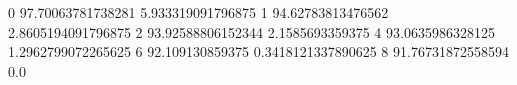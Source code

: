 0 97.70063781738281 5.933319091796875
1 94.62783813476562 2.8605194091796875
2 93.92588806152344 2.1585693359375
4 93.0635986328125 1.2962799072265625
6 92.109130859375 0.3418121337890625
8 91.76731872558594 0.0
